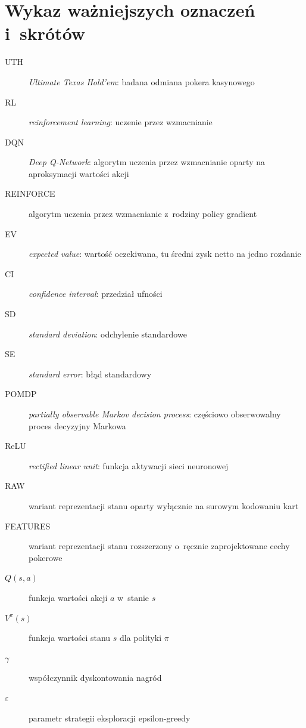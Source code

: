 \chapter*{Wykaz ważniejszych oznaczeń i~skrótów}

\begin{description}
    \item[UTH] \emph{Ultimate Texas Hold'em}: badana odmiana pokera kasynowego
    \item[RL] \emph{reinforcement learning}: uczenie przez wzmacnianie
    \item[DQN] \emph{Deep Q-Network}: algorytm uczenia przez wzmacnianie oparty na aproksymacji wartości akcji
    \item[REINFORCE] algorytm uczenia przez wzmacnianie z~rodziny policy gradient
    \item[EV] \emph{expected value}: wartość oczekiwana, tu średni zysk netto na jedno rozdanie
    \item[CI] \emph{confidence interval}: przedział ufności
    \item[SD] \emph{standard deviation}: odchylenie standardowe
    \item[SE] \emph{standard error}: błąd standardowy
    \item[POMDP] \emph{partially observable Markov decision process}: częściowo obserwowalny proces decyzyjny Markowa
    \item[ReLU] \emph{rectified linear unit}: funkcja aktywacji sieci neuronowej
    \item[RAW] wariant reprezentacji stanu oparty wyłącznie na surowym kodowaniu kart
    \item[FEATURES] wariant reprezentacji stanu rozszerzony o~ręcznie zaprojektowane cechy pokerowe
\end{description}

\bigskip

\begin{description}
    \item[$Q(s,a)$] funkcja wartości akcji $a$ w~stanie $s$
    \item[$V^{\pi}(s)$] funkcja wartości stanu $s$ dla polityki $\pi$
    \item[$\gamma$] współczynnik dyskontowania nagród
    \item[$\varepsilon$] parametr strategii eksploracji epsilon-greedy
\end{description}
